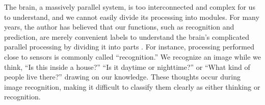 



The brain, a massively parallel system, is too interconnected and complex for us to understand,
and we cannot easily divide its processing into modules.
For many years, the author has believed that our functions, such as recognition and prediction, are
merely convenient labels to understand the brain's complicated parallel processing by dividing it into parts \citep{Intech}.
For instance, processing performed close to sensors is commonly called ``recognition.''
We recognize an image while we think, ``Is this inside a house?''
``Is it daytime or nighttime?'' or ``What kind of people live there?'' drawing on our knowledge.
These thoughts occur during image recognition, 
making it difficult to classify them clearly as either thinking or recognition.

